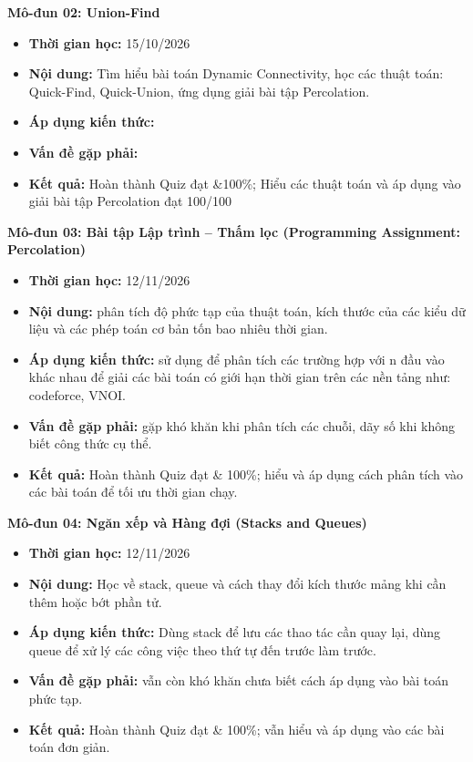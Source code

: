 \documentclass[11pt, a4paper]{article}
\begin{document}
\vspace{0.15cm}

\noindent\textbf{Mô-đun 02: Union-Find}
\begin{itemize}
    \item \textbf{Thời gian học:} 15/10/2026
    \item \textbf{Nội dung:} Tìm hiểu bài toán Dynamic Connectivity, học các thuật toán: Quick-Find, Quick-Union, ứng dụng giải bài tập Percolation. 
    \item \textbf{Áp dụng kiến thức:} 
    \item \textbf{Vấn đề gặp phải:} 
    \item \textbf{Kết quả:} Hoàn thành Quiz đạt \&100\%; Hiểu các thuật toán và áp dụng vào giải bài tập Percolation đạt 100/100
\end{itemize}

\vspace{0.15cm}

\noindent\textbf{Mô-đun 03: Bài tập Lập trình -- Thấm lọc (Programming Assignment: Percolation)}
\begin{itemize}
    \item \textbf{Thời gian học:} 12/11/2026 
    \item \textbf{Nội dung:} phân tích độ phức tạp của thuật toán, kích thước của các kiểu dữ liệu và các phép toán cơ bản tốn bao nhiêu thời gian.
    \item \textbf{Áp dụng kiến thức:} sử dụng để phân tích các trường hợp với n đầu vào khác nhau để giải các bài toán có giới hạn thời gian trên các nền tảng như: codeforce, VNOI.
    \item \textbf{Vấn đề gặp phải:} gặp khó khăn khi phân tích các chuỗi, dãy số khi không biết công thức cụ thể.
    \item \textbf{Kết quả:} Hoàn thành Quiz đạt \& 100\%; hiểu và áp dụng cách phân tích vào các bài toán để tối ưu thời gian chạy.  
\end{itemize}

\vspace{0.15cm}

\noindent\textbf{Mô-đun 04: Ngăn xếp và Hàng đợi (Stacks and Queues)}
\begin{itemize}
    \item \textbf{Thời gian học:} 12/11/2026 
    \item \textbf{Nội dung:} Học về stack, queue và cách thay đổi kích thước mảng khi cần thêm hoặc bớt phần tử. 
    \item \textbf{Áp dụng kiến thức:} Dùng stack để lưu các thao tác cần quay lại, dùng queue để xử lý các công việc theo thứ tự đến trước làm trước.
    \item \textbf{Vấn đề gặp phải:} vẫn còn khó khăn chưa biết cách áp dụng vào bài toán phức tạp.
    \item \textbf{Kết quả:} Hoàn thành Quiz đạt \& 100\%; vẫn hiểu và áp dụng vào các bài toán đơn giản.
\end{itemize}
\end{document}
